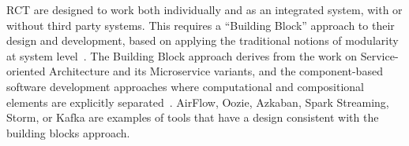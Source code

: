 \documentclass[preprint,12pt, a4paper]{elsarticle}
\begin{document}



RCT are designed to work both individually and as an integrated system, with
or without third party systems. This requires a ``Building Block'' approach to
their design and development, based on applying the traditional notions of
modularity at system level~\cite{turilli2019middleware}. The Building Block
approach derives from the work on Service-oriented Architecture and its
Microservice variants, and the component-based software development approaches
where computational and compositional elements are explicitly
separated~\cite{batory1992design,garlan1995architectural,lenz1987software,clemens1998component,schneider2000components}.
 AirFlow, Oozie,
Azkaban, Spark Streaming, Storm, or Kafka are examples of tools that have a
design consistent with the building blocks approach.


\end{document}

